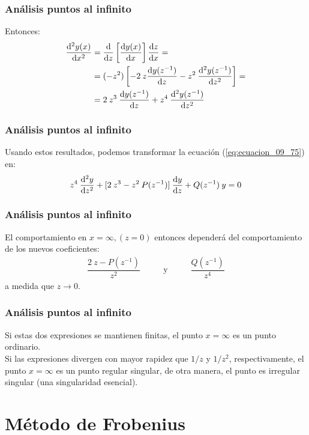 \documentclass[12pt]{beamer}
\begin{document}
\begin{frame}
\frametitle{Análisis puntos al infinito}
Entonces:
\pause
\begin{align}
\begin{aligned}
\dv[2]{y(x)}{x} &= \dv{z} \left[ \dv{y(x)}{x} \right] \dv{z}{x} = \\
&= (-z^{2}) \left[ -2 \: z \dv{y(z^{-1})}{z} - z^{2} \: \dv[2]{y(z^{-1})}{z} \right] = \\
&= 2 \: z^{3} \: \dv{y(z^{-1})}{z} + z^{4} \: \dv[2]{y(z^{-1})}{z}
\end{aligned}
\label{eq:ecuacion_09_77}
\end{align}
\end{frame}
\begin{frame}
\frametitle{Análisis puntos al infinito}
Usando estos resultados, podemos transformar la ecuación (\ref{eq:ecuacion_09_75}) en:
\pause
\begin{align}
z^{4} \: \dv[2]{y}{z} + [ 2 \: z^{3} - z^{2} \: P(z^{-1})] \: \dv{y}{z} + Q(z^{-1}) \: y = 0
\label{eq:ecuacion_09_78}
\end{align}
\end{frame}
\begin{frame}
\frametitle{Análisis puntos al infinito}
El comportamiento en $x = \infty, (z = 0)$ entonces dependerá del comportamiento de los nuevos coeficientes:
\pause
\begin{align*}
\dfrac{2 \: z - P(z^{-1})}{z^{2}} \hspace{1cm} \text{ y } \hspace{1cm} \dfrac{Q(z^{-1})}{z^{4}}
\end{align*}
a medida que $z \to 0$.
\end{frame}
\begin{frame}
\frametitle{Análisis puntos al infinito}
Si estas dos expresiones se mantienen finitas, el punto $x = \infty$ es un punto ordinario.
\\
\bigskip
\pause
Si las expresiones divergen con mayor rapidez que $1/z$ y $1/z^{2}$, respectivamente, el punto $x = \infty$ es un punto regular singular, de otra manera, el punto es irregular singular (una singularidad esencial).
\end{frame}

\section{Método de Frobenius}
\end{document}
